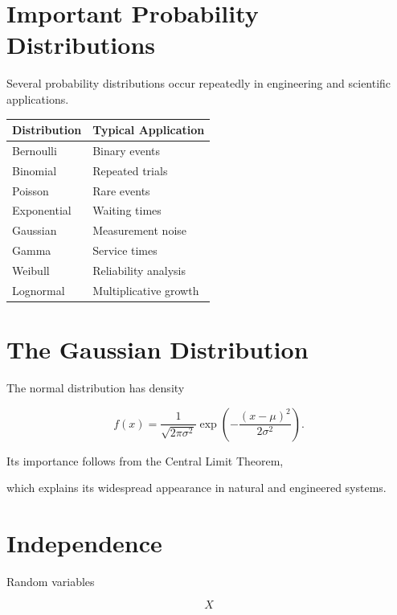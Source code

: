 \documentclass[11pt,fleqn]{book}
\numberwithin{equation}{chapter}
\theoremstyle{plain}
\theoremstyle{definition}
\theoremstyle{remark}
\begin{document}

\section{Important Probability Distributions}

Several probability distributions occur repeatedly in engineering and
scientific applications.

\begin{center}
\begin{tabular}{ll}
\toprule
Distribution & Typical Application\\
\midrule
Bernoulli & Binary events\\
Binomial & Repeated trials\\
Poisson & Rare events\\
Exponential & Waiting times\\
Gaussian & Measurement noise\\
Gamma & Service times\\
Weibull & Reliability analysis\\
Lognormal & Multiplicative growth\\
\bottomrule
\end{tabular}
\end{center}


\section{The Gaussian Distribution}

The normal distribution has density

\[
\boxed{
f(x)
=
\frac{1}
{\sqrt{2\pi\sigma^2}}
\exp
\left(
-
\frac{(x-\mu)^2}
{2\sigma^2}
\right).
}
\]

Its importance follows from the Central Limit Theorem,

which explains its widespread appearance in natural and engineered
systems.


\section{Independence}

Random variables

\[
X
\]
\end{document}
